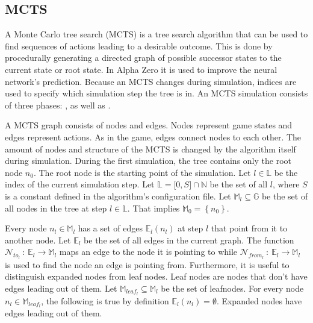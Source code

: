 \documentclass[12pt]{article}
\begin{document}
\subsection{MCTS \cite{chaslot2008parallel}\cite{silver2018general}}
A Monte Carlo tree search (MCTS) is a tree search algorithm that can be used to find sequences of actions leading to a desirable outcome. This is done by procedurally generating a directed graph of possible successor states to the current state or root state. In Alpha Zero it is used to improve the neural network's prediction.
Because an MCTS changes during simulation, indices are used to specify which simulation step the tree is in. An MCTS simulation consists of three phases: ,  as well as .

A MCTS graph consists of nodes and edges. Nodes represent game states and edges represent actions. As in the game, edges connect nodes to each other.
The amount of nodes and structure of the MCTS is changed by the algorithm itself during simulation. During the first simulation, the tree contains only the root node \(n_0\). The root node is the starting point of the simulation. Let \(l \in \mathbb L\) be the index of the current simulation step. Let \(\mathbb L = \mathbb [0, S]\cap\mathbb N\) be the set of all \(l\), where \(S\) is a constant defined in the algorithm's configuration file. Let \(\mathbb{M}_l \subseteq \mathbb{G}\) be the set of all nodes in the tree at step \(l\in\mathbb L\). That implies \(\mathbb M_0 = \left\{n_0\right\}\).

 Every node \(n_l \in \mathbb{M}_l\) has a set of edges \(\mathbb{E}_l(n_l)\) at step \(l\) that point from it to another node. Let \(\mathbb{E}_l\) be the set of all edges in the current graph. The function \(\mathcal{N}_{to_l}~:~\mathbb{E}_{l}\to\mathbb{M}_l\) maps an edge to the node it is pointing to while \(\mathcal{N}_{from_l}~:~\mathbb{E}_{l}\to\mathbb{M}_l\) is used to find the node an edge is pointing from.
Furthermore, it is useful to distinguish expanded nodes from leaf nodes. Leaf nodes are nodes that don't have edges leading out of them. Let \(\mathbb{M}_{leaf_l} \subseteq \mathbb{M}_l\) be the set of leafnodes. For every node \(n_l\in \mathbb{M}_{leaf_l}\), the following is true by definition \(\mathbb{E}_l(n_l) = \emptyset\). Expanded nodes have edges leading out of them.
\end{document}
